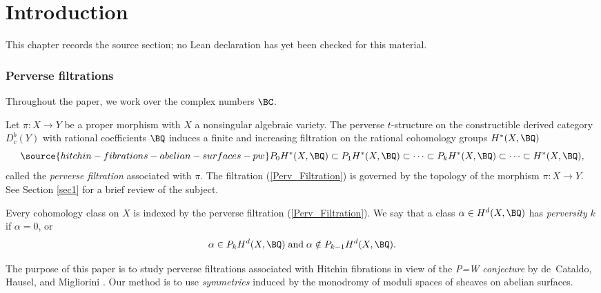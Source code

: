 \chapter{Introduction}
\label{hitchin-fibrations-abelian-surfaces-pw-chapter-01}

\begin{remark}
\label{hitchin-fibrations-abelian-surfaces-pw-chapter-01-source}
This chapter records the source section; no Lean declaration has yet been checked for this material.
\notready
\end{remark}

\subsection{Perverse filtrations}
 Throughout the paper, we work over the complex numbers $\BC$.

Let $\pi: X \rightarrow Y$ be a proper morphism with $X$ a nonsingular algebraic variety. The perverse $t$-structure on the constructible derived category $D_c^b(Y)$ with rational coefficients $\BQ$ induces a finite and  increasing filtration on the rational cohomology groups $H^*(X, \BQ)$
\begin{equation} \label{Perv_Filtration}
\source{hitchin-fibrations-abelian-surfaces-pw}
    P_0H^\ast(X, \BQ) \subset P_1H^\ast(X, \BQ) \subset \dots \subset P_kH^\ast(X, \BQ) \subset \dots \subset H^\ast(X, \BQ),
\end{equation}
called the \emph{perverse filtration} associated with $\pi$. The filtration (\ref{Perv_Filtration}) is governed by the topology of the morphism $\pi: X\rightarrow Y$. See Section \ref{sec1} for a brief review of the subject.

Every cohomology class on $X$ is indexed by the perverse filtration (\ref{Perv_Filtration}). We say that a class $\alpha \in H^d(X, \BQ)$ has \emph{perversity} $k$ if $\alpha = 0$, or
\[
\alpha \in P_kH^d(X, \BQ) \; \mathrm{and} \;  \alpha \notin P_{k-1}H^d(X, \BQ).
\]


The purpose of this paper is to study perverse filtrations associated with Hitchin fibrations in view of the \emph{P=W conjecture} by de~Cataldo, Hausel, and Migliorini \cite{dCHM1}. Our method is to use \emph{symmetries} induced by the monodromy of moduli spaces of sheaves on abelian surfaces.

